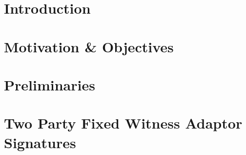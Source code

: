\documentclass[draft,final]{vutinfth} %
\theoremstyle{definition}
\begin{document}
\frontmatter %

\addstatementpage


\begin{acknowledgements*}
\end{acknowledgements*}


\begin{abstract}
\end{abstract}


\tableofcontents %

\mainmatter

\chapter{Introduction}\label{chp:introduction}


\chapter{Motivation \& Objectives}\label{chp:motivation}


\chapter{Preliminaries}\label{chp:preliminaries}


\chapter{Two Party Fixed Witness Adaptor Signatures}\label{chp:fixedWitnessSignatures}

\end{document}
